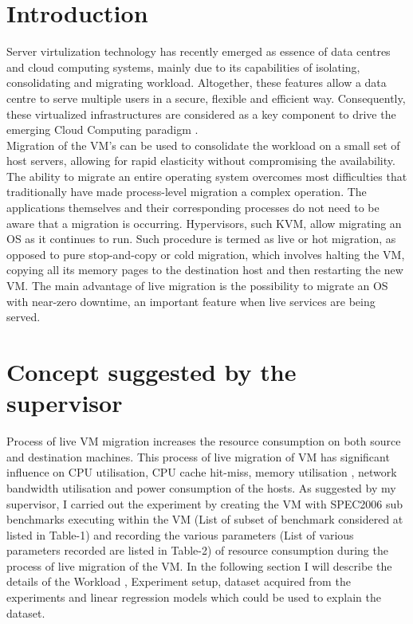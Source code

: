 \documentclass[a4paper,10pt,twoside]{article}
\begin{document}
\section{Introduction}
Server virtulization technology has recently emerged as essence of data centres and cloud computing systems, mainly due to its capabilities of isolating, consolidating and migrating workload. Altogether, these features allow a data centre to serve multiple users in a secure, flexible and efficient way. Consequently, these virtualized infrastructures are considered as a key component to drive the emerging Cloud Computing paradigm \cite{voorsluys2009cost}. \\
Migration of the VM's  can be used to consolidate the workload on a small set of host servers, allowing for rapid elasticity without compromising the availability. The ability to migrate an entire operating system overcomes most difficulties that traditionally have made process-level migration a complex operation. The applications themselves and their corresponding processes do not need to be aware that a migration is occurring. Hypervisors, such KVM, allow migrating an OS as it continues to run. Such procedure is termed as live or hot migration, as opposed to pure stop-and-copy or cold migration, which involves halting the VM, copying all its memory pages to the destination host and then restarting the new VM. The main advantage of live migration is the possibility to migrate an OS with near-zero downtime, an important feature when live services are being served.\cite{habib2008virtualization}
\section{Concept suggested by the supervisor}
Process of live VM migration increases the resource consumption on both source and destination machines. This process of live migration of VM has significant influence on CPU utilisation, CPU cache hit-miss, memory utilisation , network bandwidth utilisation and power consumption of the hosts. As suggested by my supervisor, I carried out the experiment by creating the VM with SPEC2006 sub benchmarks executing within the VM (List of subset of benchmark considered at listed in Table-1) and recording the various parameters (List of various parameters recorded are listed in Table-2) of resource consumption during the process of live migration of the VM. In the following section I will describe the details of the Workload , Experiment setup, dataset acquired  from the experiments and linear regression models which could be used to explain the dataset.
\end{document}
